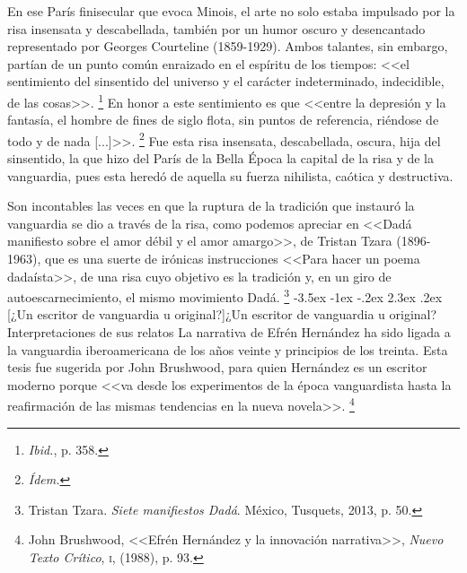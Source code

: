 \documentclass[14pt,twoside,final]{extbook} %
\makeatletter
\let\oldfootnote\footnote
\renewcommand\footnote[1]{%
\oldfootnote{\hspace{1mm}#1}}
\renewcommand\section{\@startsection {section}{1}{\z@}%
                                     {-3.5ex \@plus -1ex \@minus -.2ex}%
                                     {2.3ex \@plus .2ex}%
                                     {\normalfont\large\bfseries\sc}}
\makeatother
\begin{document}
En ese París finisecular que evoca Minois, el arte no solo estaba impulsado por la risa insensata y descabellada, también por un humor oscuro y desencantado representado por Georges Courteline (1859-1929). Ambos talantes, sin embargo, partían de un punto común enraizado en el espíritu de los tiempos: <<el sentimiento del sinsentido del universo y el carácter indeterminado, indecidible, de las cosas>>.\footnote{\emph{Ibid.}, p. 358.} En honor a este sentimiento es que <<entre la depresión y la fantasía, el hombre de fines de siglo flota, sin puntos de referencia, riéndose de todo y de nada [...]>>.\footnote{\emph{Ídem.}} Fue esta risa insensata, descabellada, oscura, hija del sinsentido, la que hizo del París de la Bella Época la capital de la risa y de la vanguardia, pues esta heredó de aquella su fuerza nihilista, caótica y destructiva.

Son incontables las veces en que la ruptura de la tradición que instauró la vanguardia se dio a través de la risa, como podemos apreciar en <<Dadá manifiesto sobre el amor débil y el amor amargo>>, de Tristan Tzara (\mbox{1896-1963}), que es una suerte de irónicas instrucciones <<Para hacer un poema dadaísta>>, de una risa cuyo objetivo es la tradición y, en un giro de autoescarnecimiento, el mismo movimiento Dadá.\footnote{Tristan Tzara. \emph{Siete manifiestos Dadá}. México, Tusquets, 2013, p. 50.}
\section[¿Un escritor de vanguardia u original?]{¿Un escritor de vanguardia u original? Interpretaciones de sus relatos}\label{sec:un-escritor-de-vanguardia-u-original-interprestaciones-de-sus-relatos}
La narrativa de Efrén Hernández ha sido ligada a la vanguardia iberoamericana de los años veinte y principios de los treinta. Esta tesis fue sugerida por John Brushwood, para quien Hernández es un escritor moderno porque <<va desde los experimentos de la época vanguardista hasta la reafirmación de las mismas tendencias en la nueva novela>>.\footnote{John Brushwood, <<Efrén Hernández y la innovación narrativa>>, \emph{Nuevo Texto Crítico}, \textsc{i}, (1988), p. 93.}
\end{document}
